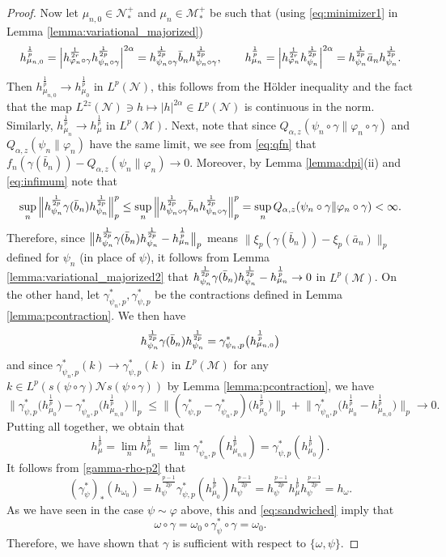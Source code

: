 \documentclass[12pt]{article}
\theoremstyle{definition}
\theoremstyle{remark}
\numberwithin{equation}{section}
\def\Me{\mathcal M}
\def\Ne{\mathcal N}
\def\ffi{\varphi}
\begin{document}
\begin{proof}
Now let $\mu_{n,0}\in \Ne_*^+$ and $\mu_n\in \Me_*^+$ be such that (using  \eqref{eq:minimizer1}
in Lemma \ref{lemma:variational_majorized})
\begin{align*}
h_{\mu_{n,0}}^{\frac 1p}=
\Big|h_{\ffi_n\circ\gamma}^{1\over 2r}h_{\psi_n\circ\gamma}^{1\over 2p}\Big|^{2\alpha}=
h_{\psi_n\circ\gamma}^{\frac 1{2p}}\bar b_{n}
h_{\psi_n\circ\gamma}^{\frac1{2p}},\qquad
h_{\mu_{n}}^{\frac1p}=\Big|h_{\ffi_n}^{1\over 2r}h_{\psi_n}^{1\over 2p}\Big|^{2\alpha}=
h_{\psi_n}^{\frac 1{2p}}\bar a_{n}h_{\psi_n}^{\frac1{2p}}. 
\end{align*}
Then $h_{\mu_{n,0}}^{\frac1p}\to h_{\mu_0}^{\frac1p}$ in $L^p(\Ne)$, this follows from the H\"older
inequality and the fact \cite{kosaki1984applicationsuc} that the map
$L^{2z}(\Ne)\ni h\mapsto |h|^{2\alpha}\in L^p(\Ne)$ is continuous in the norm. Similarly,
$h_{\mu_n}^{\frac1p}\to h_\mu^{\frac1p}$ in $L^p(\Me)$. 
Next, note that since
$Q_{\alpha,z}(\psi_n\circ\gamma\|\ffi_n\circ\gamma)$ and $Q_{\alpha,z}(\psi_n\|\ffi_n)$
have the same limit, we see from \eqref{eq:qfn} that
$f_n(\gamma(\bar b_{n}))-Q_{\alpha,z}(\psi_n\|\ffi_n)\to0$.
Moreover, by Lemma \ref{lemma:dpi}(ii) and \eqref{eq:infimum} note that
\[
\sup_n\Big\|h_{\psi_n}^{\frac 1{2p}}\gamma(\bar b_{n})h_{\psi_n}^{1\over 2p}\Big\|_p^p
\le\sup_n\Big\|h_{\psi_n\circ\gamma}^{\frac 1{2p}}\bar b_{n}
h_{\psi_n\circ\gamma}^{\frac 1{2p}}\Big\|_p^p
=\sup_nQ_{\alpha,z}(\psi_n\circ\gamma\|\ffi_n\circ\gamma)<\infty.
\]
Therefore, since
$\big\|h_{\psi_n}^{\frac 1{2p}}\gamma(\bar b_{n})h_{\psi_n}^{1\over 2p}-h_{\mu_n}^{\frac1p}\big\|_p$
means $\|\xi_p(\gamma(\bar b_n))-\xi_p(\bar a_n)\|_p$ defined for $\psi_n$ (in place of $\psi$),
it follows from Lemma \ref{lemma:variational_majorized2} that 
$h_{\psi_n}^{\frac 1{2p}}\gamma(\bar b_{n})h_{\psi_n}^{1\over 2p}-h_{\mu_n}^{\frac1p}\to
0$ in $L^p(\Me)$.  On the other hand, let $\gamma^*_{\psi_n,p}, \gamma^*_{\psi,p}$ be the
contractions defined in Lemma \ref{lemma:pcontraction}. We
then have 
\[
h_{\psi_n}^{\frac 1{2p}}\gamma(\bar b_{n})h_{\psi_n}^{1\over
2p}=\gamma_{\psi_{n},p}^*\bigl(h_{\mu_{n,0}}^{\frac1p}\bigr)
\]
and since $\gamma^*_{\psi_{n},p}(k)\to \gamma^*_{\psi,p}(k)$ in $L^p(\Me)$ for any
$k\in L^p(s(\psi\circ\gamma)\Ne s(\psi\circ\gamma))$ by Lemma \ref{lemma:pcontraction}, we have  
\[
\Big\|\gamma^*_{\psi,p}\bigl(h_{\mu_0}^{\frac1p}\bigr)-
\gamma_{\psi_{n},p}^*\bigl(h_{\mu_{n,0}}^{\frac1p}\bigr)\Big\|_p\le
\Big\|(\gamma^*_{\psi,p}-\gamma^*_{\psi_{n},p})\bigl(h_{\mu_0}^{\frac1p}\bigr)\Big\|_p+
\Big\|\gamma^*_{\psi_{n},p}\bigl(h_{\mu_0}^{\frac1p}-h_{\mu_{n,0}}^{\frac1p}\bigr)\Big\|_p\to 0.
\]
Putting all together, we obtain that 
\[
h_\mu^{\frac1p}=\lim_n h_{\mu_n}^{\frac1p}=\lim_n
\gamma^*_{\psi_{n},p}(h_{\mu_{n,0}}^{\frac1p})=\gamma^*_{\psi,p}(h_{\mu_0}^{\frac1p}).
\]
It follows from \eqref{gamma-rho-p2} that 
\[
(\gamma^*_{\psi})_*(h_{\omega_0})=
h_{\psi}^{\frac{p-1}{2p}}\gamma^*_{\psi,p}(h_{\mu_0}^{\frac1p})h_{\psi}^{\frac{p-1}{2p}}=
h_{\psi}^{\frac{p-1}{2p}}h_\mu^{\frac1p}h_{\psi}^{\frac{p-1}{2p}}=h_\omega.
\]
As we have seen in the case $\psi\sim \ffi$ above, this and \eqref{eq:sandwiched} imply that
\[
\omega\circ\gamma= \omega_0\circ \gamma_\psi^*\circ\gamma=\omega_0.
\]
Therefore, we have shown that $\gamma$ is sufficient with respect to $\{\omega,\psi\}$.


\end{proof}
\end{document}
